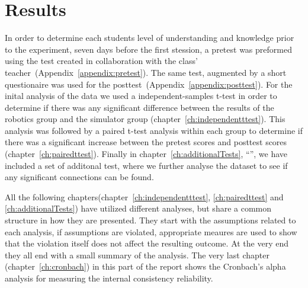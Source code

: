 \chapter{Results}
In order to determine each students level of understanding and knowledge prior to the experiment, seven days before the first stession, a pretest was preformed using the test created in collaboration with the class' teacher~(Appendix~\ref{appendix:pretest}). 
The same test, augmented by a short questionaire was used for the posttest~(Appendix~\ref{appendix:posttest}).
For the inital analysis of the data we used a independent-samples t-test in order to determine if there was any
significant difference between the results of the robotics group and the simulator group (chapter~\ref{ch:independentttest}).
This analysis was followed by a paired t-test analysis within each group 
to determine if there was a significant increase between the pretest scores and posttest scores (chapter~\ref{ch:pairedttest}).
Finally in chapter~\ref{ch:additionalTests}, "`"', we have included a set of additonal test,
where we further analyse the dataset to see if any significant connections can be found. 

\bigskip\noindent
All the following chapters(chapter~\ref{ch:independentttest}, \ref{ch:pairedttest} and \ref{ch:additionalTests}) have utilized different analyses, but share a common structure in how they are presented.
They start with the assumptions related to each analysis, if assumptions are violated, appropriate meaures are used to show that the violation itself does not affect the resulting outcome.
At the very end they all end with a small summary of the analysis. 
The very last chapter (chapter~\ref{ch:cronbach}) in this part of the report shows the Cronbach's alpha analysis for measuring the internal consistency reliability.






